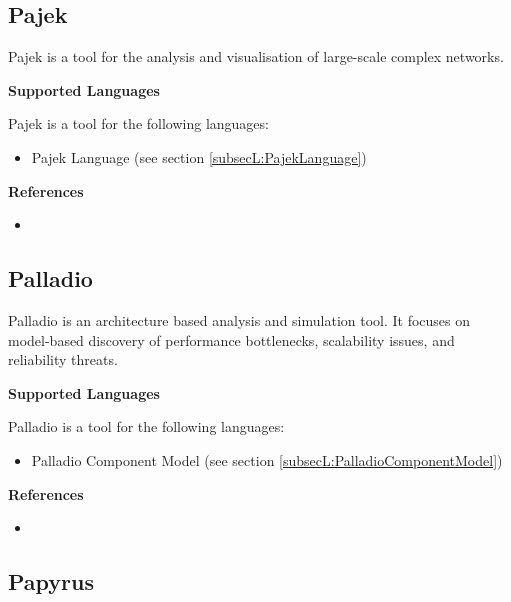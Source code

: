 \subsection{Pajek}
\label{subsecT:Pajek}


Pajek is a tool for the analysis and visualisation of large-scale complex networks.

\textbf{Supported Languages}

Pajek is a tool for the following languages:
\begin{itemize}
	\item Pajek Language (see section \ref{subsecL:PajekLanguage})
\end{itemize}


\textbf{References}
\begin{itemize}
	
\item {}
\end{itemize}



\subsection{Palladio}
\label{subsecT:Palladio}


Palladio is an architecture based analysis and simulation tool. It focuses on model-based discovery of performance bottlenecks, scalability issues, and reliability threats.

\textbf{Supported Languages}

Palladio is a tool for the following languages:
\begin{itemize}
	\item Palladio Component Model (see section \ref{subsecL:PalladioComponentModel})
\end{itemize}


\textbf{References}
\begin{itemize}
	
\item {}
\end{itemize}



\subsection{Papyrus}
\label{subsecT:Papyrus}


